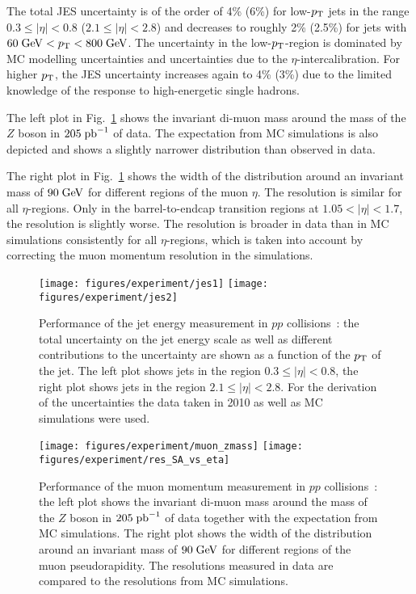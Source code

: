 The total JES uncertainty is of the order of 4\% (6\%) for low-$p_{\mathrm{T}}$ jets in the range \mbox{$0.3 \leq |\eta| < 0.8$} (\mbox{$2.1 \leq |\eta| < 2.8$}) and
decreases to roughly 2\% (2.5\%) for jets with \mbox{$60 \; \mathrm{GeV} < p_{\mathrm{T}} < 800 \; \mathrm{GeV}$}.
The uncertainty in the low-$p_{\mathrm{T}}$-region is dominated by MC modelling uncertainties and uncertainties due to the $\eta$-intercalibration.
For higher $p_{\mathrm{T}}$, the JES uncertainty increases again to 4\% (3\%) due to the limited knowledge of the response to high-energetic single
hadrons.

The left plot in Fig.~\ref{fig:muonperformance} shows the invariant di-muon mass around the mass of the $Z$ boson in \mbox{$205 \; \mathrm{pb}^{-1}$} of data.
The expectation from MC simulations is also depicted and shows a slightly narrower distribution than observed in data.

The right plot in Fig.~\ref{fig:muonperformance} shows the width of the distribution around an invariant mass of \mbox{$90 \; \mathrm{GeV}$} for different regions of
the muon $\eta$.
The resolution is similar for all $\eta$-regions.
Only in the barrel-to-endcap transition regions at \mbox{$1.05 < |\eta| < 1.7$}, the resolution is slightly worse.
The resolution is broader in data than in MC simulations consistently for all $\eta$-regions, which is taken into account by
correcting the muon momentum resolution in the simulations.

\begin{figure}[h!]
\begin{center}
\texttt{[image: figures/experiment/jes1]}
\texttt{[image: figures/experiment/jes2]}
\caption[Jet energy performance]{
  Performance of the jet energy measurement in $pp$ collisions~\cite{jetperf}:
  the total uncertainty on the jet energy scale as well as different contributions to the uncertainty are shown as a function of the $p_{\mathrm{T}}$ of the jet.
  The left plot shows jets in the region \mbox{$0.3 \leq |\eta| < 0.8$}, the right plot shows jets in the region \mbox{$2.1 \leq |\eta| < 2.8$}.
  For the derivation of the uncertainties the data taken in 2010 as well as MC simulations were used.
}
\label{fig:jetperformance}
\vspace{0.025\textwidth}
\texttt{[image: figures/experiment/muon\_zmass]}
\quad
\texttt{[image: figures/experiment/res\_SA\_vs\_eta]}
\caption[Muon momentum performance]{
  Performance of the muon momentum measurement in $pp$ collisions~\cite{muonperformanceplots}:
  the left plot shows the invariant di-muon mass around the mass of the $Z$ boson in \mbox{$205 \; \mathrm{pb}^{-1}$} of data together with the expectation
  from MC simulations.
  The right plot shows the width of the distribution around an invariant mass of \mbox{$90 \; \mathrm{GeV}$} for different regions of the muon pseudorapidity.
  The resolutions measured in data are compared to the resolutions from MC simulations.
}
\label{fig:muonperformance}
\end{center}
\end{figure}

